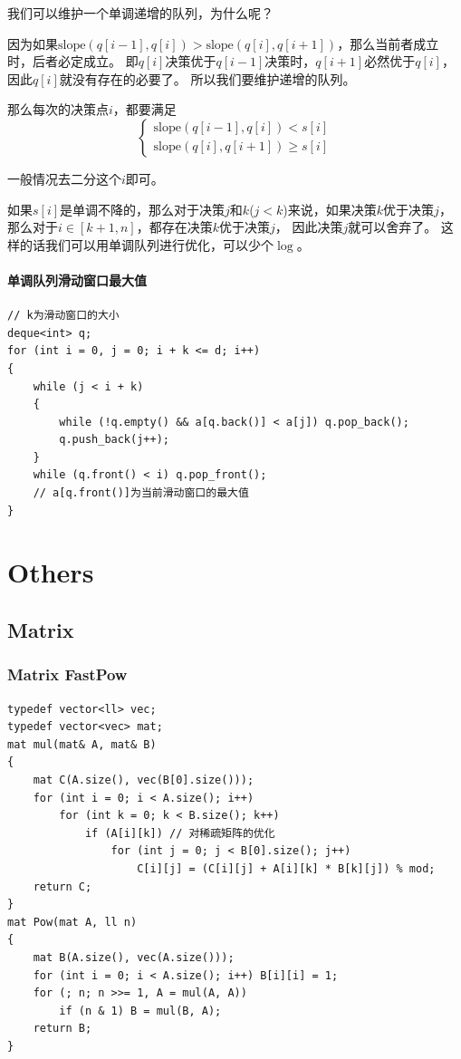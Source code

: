 \documentclass[twoside]{article}
\begin{document}
我们可以维护一个单调递增的队列，为什么呢？

因为如果$\text{slope}(q[i-1],q[i]) > \text{slope}(q[i],q[i+1])$，那么当前者成立时，后者必定成立。 即$q[i]$决策优于$q[i-1]$决策时，$q[i+1]$必然优于$q[i]$，因此$q[i]$就没有存在的必要了。 所以我们要维护递增的队列。

那么每次的决策点$i$，都要满足
$$\begin{cases}
    \text{slope}(q[i-1],q[i]) < s[i] \\
    \text{slope}(q[i],q[i+1]) \ge s[i]
\end{cases}$$

一般情况去二分这个$i$即可。

如果$s[i]$是单调不降的，那么对于决策$j$和$k$($j < k$)来说，如果决策$k$优于决策$j$，那么对于$i \in [k+1,n]$，都存在决策$k$优于决策$j$， 因此决策$j$就可以舍弃了。 这样的话我们可以用单调队列进行优化，可以少个$\log$。

\paragraph{单调队列滑动窗口最大值}
\begin{lstlisting}
// k为滑动窗口的大小
deque<int> q;
for (int i = 0, j = 0; i + k <= d; i++)
{
    while (j < i + k)
    {
        while (!q.empty() && a[q.back()] < a[j]) q.pop_back();
        q.push_back(j++);
    }
    while (q.front() < i) q.pop_front();
    // a[q.front()]为当前滑动窗口的最大值
}
\end{lstlisting}
\clearpage

\section{Others}

\subsection{Matrix}
\subsubsection{Matrix FastPow}
\begin{lstlisting}
typedef vector<ll> vec;
typedef vector<vec> mat;
mat mul(mat& A, mat& B)
{
    mat C(A.size(), vec(B[0].size()));
    for (int i = 0; i < A.size(); i++)
        for (int k = 0; k < B.size(); k++)
            if (A[i][k]) // 对稀疏矩阵的优化
                for (int j = 0; j < B[0].size(); j++)
                    C[i][j] = (C[i][j] + A[i][k] * B[k][j]) % mod;
    return C;
}
mat Pow(mat A, ll n)
{
    mat B(A.size(), vec(A.size()));
    for (int i = 0; i < A.size(); i++) B[i][i] = 1;
    for (; n; n >>= 1, A = mul(A, A))
        if (n & 1) B = mul(B, A);
    return B;
}
\end{lstlisting}
\end{document}
